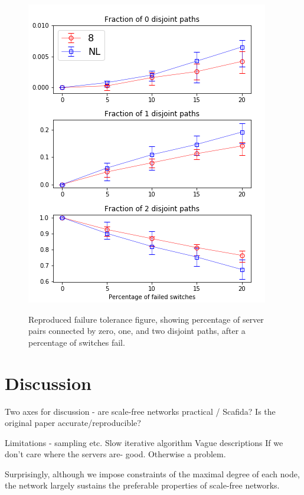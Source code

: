 \vspace{3pt}
\begin{figure}[h!]
\centering
   \includegraphics[width=1\linewidth]{figures/error}
   \label{fig:Ng2}

\caption{Reproduced failure tolerance figure, showing percentage of server pairs connected by zero, one, and two disjoint paths, after a percentage of switches fail.}
\end{figure}

\section{Discussion}
Two axes for discussion - are scale-free networks practical / Scafida? Is the original paper accurate/reproducible?

Limitations - sampling etc.
Slow iterative algorithm
Vague descriptions 
If we don't care where the servers are- good. Otherwise a problem.

Surprisingly, although we impose constraints of the maximal degree of each node, the network largely sustains the preferable properties of scale-free networks.

